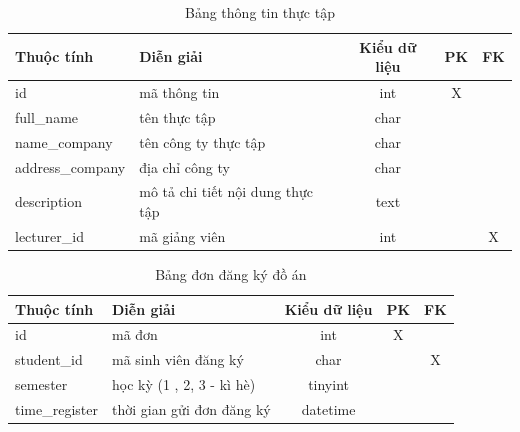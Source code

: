     \begin{table}[h!]
      \centering
      \begin{tabular}{|l|p{}|c|c|c|}
        \hline
        \textbf{Thuộc tính} & \textbf{Diễn giải} & \textbf{Kiểu dữ liệu} & \textbf{PK} & \textbf{FK}\\
        \hline
        id & mã thông tin & int & X &\\
        \hline
        full\_name & tên thực tập & char & &\\
        \hline
        name\_company & tên công ty thực tập & char & &\\
        \hline
        address\_company & địa chỉ công ty & char & &\\
        \hline
        description & mô tả chi tiết nội dung thực tập & text & &\\
        \hline
        lecturer\_id & mã giảng viên & int & & X\\
        \hline
      \end{tabular}
      \caption{Bảng thông tin thực tập}
    \end{table}

    \begin{table}[h!]
      \centering
      \begin{tabular}{|l|p{}|c|c|c|}
        \hline
        \textbf{Thuộc tính} & \textbf{Diễn giải} & \textbf{Kiểu dữ liệu} & \textbf{PK} & \textbf{FK}\\
        \hline
        id & mã đơn & int & X &\\
        \hline
        student\_id & mã sinh viên đăng ký & char & & X\\
        \hline
        semester & học kỳ (1 , 2, 3 - kì hè) & tinyint & &\\
        \hline
        time\_register & thời gian gửi đơn đăng ký & datetime & &\\
        \hline
      \end{tabular}
      \caption{Bảng đơn đăng ký đồ án}
    \end{table}

